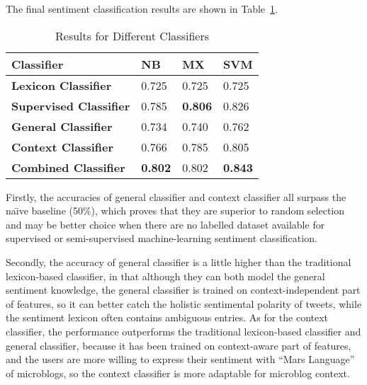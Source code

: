 \begin{definition}[假设]
The final sentiment classification results are shown in Table~\ref{t1}. 
\begin{table}[!t]
\caption{Results for Different Classifiers}
\label{t1}
\centering
\begin{tabular}{|l||l|l|l|}
\hline
\bfseries Classifier &  \bfseries NB    &   \bfseries MX    &   \bfseries SVM    \\
\hline
\bfseries Lexicon Classifier & 0.725 & 0.725 & 0.725 \\
\hline
\bfseries Supervised Classifier & 0.785 & \textbf{0.806} & 0.826 \\
\hline
\bfseries General Classifier & 0.734 &  0.740 & 0.762 \\
\hline
\bfseries Context Classifier & 0.766 & 0.785 & 0.805 \\
\hline
\bfseries Combined Classifier & \textbf{0.802} & 0.802 & \textbf{0.843} \\
\hline
\end{tabular}
\end{table}

Firstly, the accuracies of general classifier and context classifier all surpass the na\"\i ve baseline (50\%), which proves that they are superior to random selection and may be better choice when there are no labelled dataset available for supervised or semi-supervised machine-learning sentiment classification.

Secondly, the accuracy of general classifier is a little higher than the traditional lexicon-based classifier, in that although they can both model the general sentiment knowledge, the general classifier is trained on context-independent part of features, so it can better catch the holistic sentimental polarity of tweets, while the sentiment lexicon often contains ambiguous entries. 
As for the context classifier, the performance outperforms the traditional lexicon-based classifier and general classifier, because it has been trained on context-aware part of features, and the users are more willing to express their sentiment with ``Mars Language'' of microblogs, so the context classifier is more adaptable for microblog context.


\end{definition}
